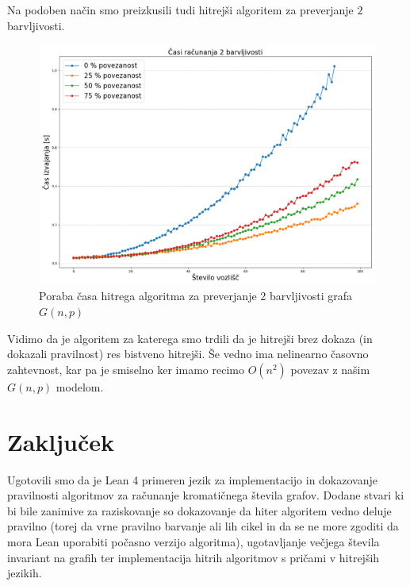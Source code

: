 \documentclass[mat1]{fmfdelo}
\begin{document}
Na podoben način smo preizkusili tudi hitrejši algoritem za preverjanje $2$ barvljivosti.
\begin{figure}[H]
\begin{center}
\includegraphics[scale=0.4]{assets/2barvFast}
\caption{Poraba časa hitrega algoritma za preverjanje 2 barvljivosti grafa $G(n, p)$}
\label{slika2}
\end{center}
\end{figure}

Vidimo da je algoritem za katerega smo trdili da je hitrejši brez dokaza (in dokazali pravilnost) res bistveno hitrejši.
Še vedno ima nelinearno časovno zahtevnost, kar pa je smiselno ker imamo recimo $O(n^2)$ povezav z našim $G(n, p)$ modelom.

\section{Zaključek}
Ugotovili smo da je Lean 4 primeren jezik za implementacijo in dokazovanje pravilnosti algoritmov za računanje kromatičnega
števila grafov. Dodane stvari ki bi bile zanimive za raziskovanje so dokazovanje da hiter algoritem vedno deluje pravilno
(torej da vrne pravilno barvanje ali lih cikel in da se ne more zgoditi da mora Lean uporabiti počasno verzijo algoritma),
ugotavljanje večjega števila invariant na grafih ter implementacija hitrih algoritmov s pričami v hitrejših jezikih.
\end{document}
